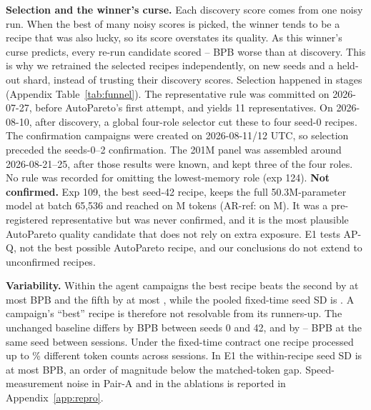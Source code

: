 \documentclass{article}
\newif\ifshowhumanmarkers \showhumanmarkersfalse
\newcommand{\humantag}[1]{{\color{humanframe}\sffamily\scriptsize\bfseries HUMAN AUTHOR MUST REWRITE/VERIFY [#1]}\ }
\newcommand{\humanauthor}[2][]{\ifshowhumanmarkers\begin{humanbox}\humantag{#1}#2\end{humanbox}\else #2\par\fi}
\begin{document}
\humanauthor[P2-09 r6]{\textbf{Selection and the winner's curse.} Each discovery score comes from one noisy run. When the best of many noisy scores is picked, the winner tends to be a recipe that was also lucky, so its score overstates its quality. As this winner's curse predicts, every re-run candidate scored \CROptMin--\CROptMax{} BPB worse than at discovery. This is why we retrained the selected recipes independently, on new seeds and a held-out shard, instead of trusting their discovery scores. Selection happened in stages (Appendix Table~\ref{tab:funnel}). The representative rule was committed on 2026-07-27, before AutoPareto's first attempt, and yields 11 representatives. On 2026-08-10, after discovery, a global four-role selector cut these to four seed-0 recipes. The confirmation campaigns were created on 2026-08-11/12 UTC, so selection preceded the seeds-0--2 confirmation. The 201M panel was assembled around 2026-08-21--25, after those results were known, and kept three of the four roles. No rule was recorded for omitting the lowest-memory role (exp 124). \textbf{Not confirmed.} Exp 109, the best seed-42 recipe, keeps the full 50.3M-parameter model at batch 65,536 and reached \CRExpOneZeroNineBPB{} on \CRExpOneZeroNineTokens M tokens (AR-ref: \CRSeedFortyTwoAR{} on \CRExpSixEightTokens M). It was a pre-registered representative but was never confirmed, and it is the most plausible AutoPareto quality candidate that does not rely on extra exposure. E1 tests AP-Q, not the best possible AutoPareto recipe, and our conclusions do not extend to unconfirmed recipes.}

\humanauthor[P2-10 r6]{\textbf{Variability.} Within the agent campaigns the best recipe beats the second by at most \CRGapTwoMax{} BPB and the fifth by at most \CRGapFiveMax, while the pooled fixed-time seed SD is \CRPooledSD. A campaign's ``best'' recipe is therefore not resolvable from its runners-up. The unchanged baseline differs by \CRBaseSeedEffect{} BPB between seeds 0 and 42, and by \CRSessionLo--\CRSessionHi{} BPB at the same seed between sessions. Under the fixed-time contract one recipe processed up to \CRTokenSpreadMax\% different token counts across sessions. In E1 the within-recipe seed SD is at most \CREOneMaxSD{} BPB, an order of magnitude below the matched-token gap. Speed-measurement noise in Pair-A and in the ablations is reported in Appendix~\ref{app:repro}.}
\end{document}
